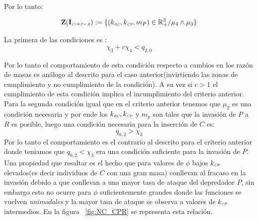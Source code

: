 Por lo tanto:

\begin{equation}
\mathbf{Z(I_{\textit{\tiny C} \to \textit{\tiny P}-\textit{\tiny R}})} := \{ (k_{\textit{\tiny RC}},k_{\textit{\tiny CP}},m_P) \in \mathbb{R}^3_+ / \mu_4 \land \mu_3 \}
\end{equation}

La primera de las condiciones es :
\begin{equation}
  \chi_3 + c \chi_4 < q_{2,0}
\end{equation}

Por lo tanto el comportamiento de esta condici\'on respecto a cambios en los raz\'on de masas es an\'alogo al descrito para el caso anterior(invirtiendo las zonas de cumplimiento y no cumplimiento de la condici\'on). A su vez si $c>1$ el cumplimiento de esta condici\'on implica el incumplimiento del criterio anterior.\\
Para la segunda condici\'on igual que en el criterio anterior tenemos que $\mu_2$ es una condici\'on necesaria y por ende los $k_{\textit{\tiny RC}}, k_{\textit{\tiny CP}}$ y $m_p$ son tales que la invasi\'on de $P$ a $R$ es posible, luego una condici\'on necesaria para la inserci\'on de $C$ es:
\begin{equation}
  q_{0,2} > \chi_3
\end{equation}
Por lo tanto el comportamiento es el contrario al descrito para el criterio anterior donde teniamos que $q_{0,2} < \chi_3$ era una condici\'on suficiente para la invasi\'on de $P$. Una propiedad que resaltar es el hecho que para valores de $\phi$ bajos $k_{\textit{\tiny CP}}$ elevados(es decir individuos de $C$ con una gran masa) conllevan al fracaso en la invasi\'on debido a que conllevan a una mayor tasa de ataque del depredador $P$, sin embargo esto no ocurre para $\phi$ suficientemente grandes
 donde las funciones se vuelven \emph{unimodales} y la mayor tasa de ataque se observa a valores de $k_{\textit{\tiny CP}}$ intermedios. En la figura ~\ref{fig:NC_CPR} se representa esta relaci\'on. \\


